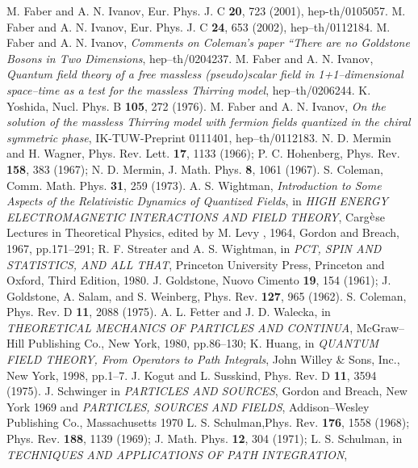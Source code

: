 \documentclass[a4paper,12pt] {article}
\begin{document}
\begin{thebibliography}{9}
M. Faber and A. N. Ivanov, Eur. Phys. J. C {\bf
20}, 723 (2001), hep-th/0105057.
%
M. Faber and A. N. Ivanov, 
Eur. Phys. J. C {\bf 24}, 653 (2002), hep--th/0112184.
%
M. Faber and A. N. Ivanov,
{\it Comments on Coleman's paper ``There are no Goldstone Bosons 
in Two Dimensions}, hep--th/0204237.
%
M. Faber and A. N. Ivanov,
{\it Quantum field theory of a free massless (pseudo)scalar field in
1+1--dimensional space--time as a test for the massless Thirring model},
hep--th/0206244.
%
K. Yoshida,
Nucl. Phys. B {\bf 105}, 272 (1976).
%
M. Faber and A. N. Ivanov,
{\it On the solution of the massless
Thirring model  with fermion
fields quantized in the chiral symmetric phase},
IK-TUW-Preprint 0111401, hep--th/0112183.
%
N. D. Mermin and H. Wagner, 
Phys. Rev. Lett. {\bf 17},
1133 (1966); 
P. C. Hohenberg, 
Phys. Rev. {\bf 158}, 383 (1967);
N. D. Mermin, J. Math. Phys. {\bf 8}, 1061 (1967).
%
S. Coleman, 
Comm. Math. Phys. {\bf 31}, 259 (1973).
%
A. S. Wightman, 
{\it Introduction to Some Aspects of
the Relativistic Dynamics of Quantized Fields}, in 
{\it HIGH ENERGY ELECTROMAGNETIC INTERACTIONS AND FIELD THEORY}, 
Carg$\grave{\rm e}$se
Lectures in Theoretical Physics, edited by M. Levy , 1964, Gordon and
Breach, 1967, pp.171--291;
R. F. Streater and A. S. Wightman,
in {\it PCT, SPIN AND STATISTICS, AND ALL THAT},
Princeton University Press, Princeton and Oxford, Third Edition, 1980.
%
J. Goldstone,
Nuovo Cimento {\bf 19}, 154 (1961);
J. Goldstone, A. Salam, and S. Weinberg,
Phys. Rev. {\bf 127}, 965 (1962).
%
S. Coleman,
Phys. Rev. D {\bf 11}, 2088 (1975).
%
A. L. Fetter and J. D. Walecka,
in {\it THEORETICAL MECHANICS OF PARTICLES AND CONTINUA},
McGraw--Hill Publishing Co., New York, 1980, pp.86--130;
K. Huang,
in {\it QUANTUM FIELD THEORY, From Operators to Path Integrals},
John Willey $\&$ Sons, Inc., New York, 1998, pp.1--7.
%
J. Kogut and L. Susskind,
Phys. Rev. D {\bf 11}, 3594 (1975).
%
J. Schwinger 
in {\it PARTICLES AND SOURCES}, Gordon and
Breach, New York 1969 and 
{\it PARTICLES, SOURCES AND FIELDS},
Addison--Wesley Publishing Co., Massachusetts 1970
%
L. S. Schulman,Phys. Rev. {\bf 176}, 1558 (1968); 
Phys. Rev. {\bf 188}, 1139 (1969);
J. Math. Phys. {\bf 12}, 304 (1971);
L. S. Schulman,
in {\it TECHNIQUES AND APPLICATIONS OF PATH INTEGRATION},

\end{thebibliography}
\end{document}
